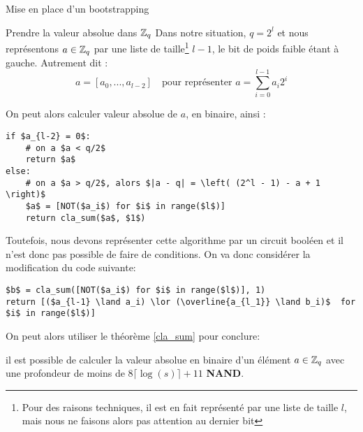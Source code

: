 \begin{section}{Mise en place d'un bootstrapping}
\begin{subsection}{Prendre la valeur absolue dans $\mathbb{Z}_q$}
	Dans notre situation, $q = 2^l$ et nous représentons $a\in \mathbb{Z}_q$ par une liste de taille\footnote{Pour des raisons techniques, il est en fait représenté par une liste de taille $l$, mais nous ne faisons alors pas attention au dernier bit} $l-1$, le bit de poids faible étant à gauche. Autrement dit :
\[ a = [a_0, ..., a_{l-2}] \quad \text{pour représenter } a = \sum_{i=0}^{l-1} a_i 2^i\]

	On peut alors calculer valeur absolue de $a$, en binaire, ainsi :

\vspace{0.3cm}
\begin{lstlisting}
if $a_{l-2} = 0$: 
	# on a $a < q/2$
	return $a$
else:
	# on a $a > q/2$, alors $|a - q| = \left( (2^l - 1) - a + 1 \right)$
	$a$ = [NOT($a_i$) for $i$ in range($l$)]
	return cla_sum($a$, $1$)
\end{lstlisting}
\vspace{0.3cm}

Toutefois, nous devons représenter cette algorithme par un circuit booléen et il n'est donc pas possible de faire de
conditions. On va donc considérer la modification du code suivante:

\vspace{0.3cm}
\begin{lstlisting}
$b$ = cla_sum([NOT($a_i$) for $i$ in range($l$)], 1)
return [($a_{l-1} \land a_i) \lor (\overline{a_{l_1}} \land b_i)$  for $i$ in range($l$)]
\end{lstlisting}
\vspace{0.3cm}

	On peut alors utiliser le théorème \ref{cla_sum} pour conclure:
\begin{prop}
il est possible de calculer la valeur absolue en binaire d'un élément $a\in \mathbb{Z}_q$ avec une profondeur de moins de
$8\lceil \log(s) \rceil + 11$ \textbf{NAND}.
\end{prop}
\end{subsection}


\end{section}
